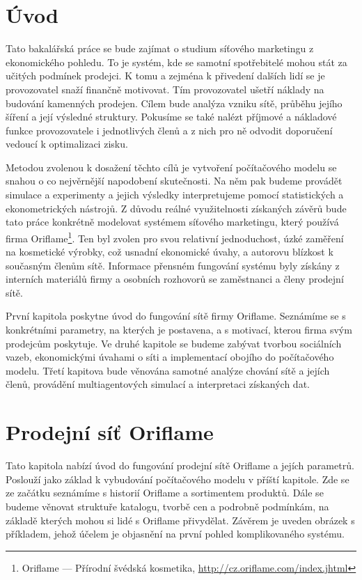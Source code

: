 \documentclass[a4wide,12pt]{report}
\begin{document}
\chapter*{Úvod}
Tato bakalářská práce se bude zajímat o studium síťového marketingu z ekonomického pohledu. To je systém, kde se samotní spotřebitelé mohou stát za učitých podmínek prodejci. K tomu a zejména k přivedení dalších lidí se je provozovatel snaží finančně motivovat. Tím provozovatel ušetří náklady na budování kamenných prodejen. Cílem bude analýza vzniku sítě, průběhu jejího šíření a její výsledné struktury. Pokusíme se také nalézt příjmové a nákladové funkce provozovatele i jednotlivých členů a z nich pro ně odvodit doporučení vedoucí k optimalizaci zisku.

Metodou zvolenou k dosažení těchto cílů je vytvoření počítačového modelu se snahou o co nejvěrnější napodobení skutečnosti. Na něm pak budeme provádět simulace a experimenty a jejich výsledky interpretujeme pomocí statistických a ekonometrických nástrojů. Z důvodu reálné využitelnosti získaných závěrů bude tato práce konkrétně modelovat systémem síťového marketingu, který používá firma Oriflame\footnote{Oriflame --- Přírodní švédská kosmetika, \url{http://cz.oriflame.com/index.jhtml}}. Ten byl zvolen pro svou relativní jednoduchost, úzké zaměření na kosmetické výrobky, což usnadní ekonomické úvahy, a autorovu blízkost k současným členům sítě. Informace přensném fungování systému byly získány z interních materiálů firmy a osobních rozhovorů se zaměstnanci a členy prodejní sítě.

První kapitola poskytne úvod do fungování sítě firmy Oriflame. Seznámíme se s konkrétními parametry, na kterých je postavena, a s motivací, kterou firma svým prodejcům poskytuje. Ve druhé kapitole se budeme zabývat tvorbou sociálních vazeb, ekonomickými úvahami o síti a implementací obojího do počítačového modelu. Třetí kapitova bude věnována samotné analýze chování sítě a jejích členů, provádění multiagentových simulací a interpretaci získaných dat.
\chapter{Prodejní síť Oriflame}
Tato kapitola nabízí úvod do fungování prodejní sítě Oriflame a jejích parametrů. Poslouží jako základ k vybudování počítačového modelu v příští kapitole. Zde se ze začátku seznámíme s historií Oriflame a sortimentem produktů. Dále se budeme věnovat struktuře katalogu, tvorbě cen a podrobně podmínkám, na základě kterých mohou si lidé s Oriflame přivydělat. Závěrem je uveden obrázek s příkladem, jehož účelem je objasnění na první pohled komplikovaného systému.
\end{document}
